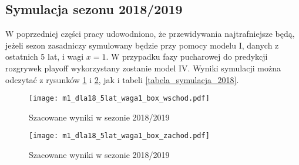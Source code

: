 \documentclass[inzynierska]{pwr_wmat_praca_dyplomowa}
\theoremstyle{plain}
\numberwithin{theorem}{chapter}
\theoremstyle{definition}
\numberwithin{theorem}{chapter}
\begin{document}
\subsection{Symulacja sezonu 2018/2019}
W poprzedniej części pracy udowodniono, że przewidywania najtrafniejsze będą, jeżeli sezon zasadniczy symulowany będzie przy pomocy modelu I, danych z ostatnich 5 lat, i wagi $x=1$. W przypadku fazy pucharowej do predykcji rozgrywek playoff wykorzystany zostanie model IV. Wyniki symulacji można odczytać z rysunków \ref{m1_dla18_5lat_waga1_box_wschod} i \ref{m1_dla18_5lat_waga1_box_zachod}, jak i tabeli \ref{tabela_symulacja_2018}.
\begin{figure}[t]
	\hspace*{-3cm}  
	\texttt{[image: m1\_dla18\_5lat\_waga1\_box\_wschod.pdf]}
	\caption{Szacowane wyniki w sezonie 2018/2019}
	\label{m1_dla18_5lat_waga1_box_wschod}
	\centering
\end{figure}
\begin{figure}[t]
	\hspace*{-3cm}  
	\texttt{[image: m1\_dla18\_5lat\_waga1\_box\_zachod.pdf]}
	\caption{Szacowane wyniki w sezonie 2018/2019}
	\label{m1_dla18_5lat_waga1_box_zachod}
	\centering
\end{figure}
\end{document}
